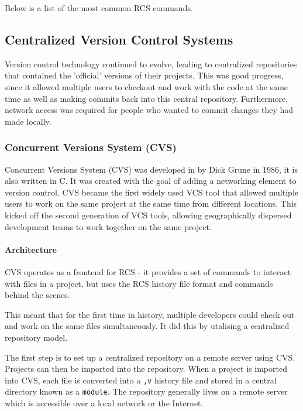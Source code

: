 Below is a list of the most common RCS commands.

\subsection{Centralized Version Control Systems}
Version control technology continued to evolve, leading to centralized repositories that contained the 'official' versions of their projects. This was good progress, since it allowed multiple users to checkout and work with the code at the same time as well as making commits back into this central repository. Furthermore, network access was required for people who wanted to commit changes they had made locally.
\subsubsection{Concurrent Versions System (CVS)}
Concurrent Versions System (CVS) was developed in by Dick Grune in 1986, it is also written in C. It was created with the goal of adding a networking element to version control. CVS became the first widely used VCS tool that allowed multiple users to work on the same project at the same time from different locations. This kicked off the second generation of VCS tools, allowing geographically dispersed development teams to work together on the same project.
\paragraph{Architecture}
CVS operates as a frontend for RCS - it provides a set of commands to interact with files in a project, but uses the RCS history file format and commands behind the scenes.

This meant that for the first time in history, multiple developers could check out and work on the same files simultaneously. It did this by utalising a centralized repository model.

The first step is to set up a centralized repository on a remote server using CVS. Projects can then be imported into the repository. When a project is imported into CVS, each file is converted into a \lstinline{,v} history file and stored in a central directory known as a \lstinline{module}. The repository generally lives on a remote server which is accessible over a local network or the Internet.

